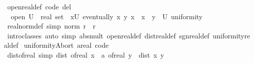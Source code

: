 \begin{isabellebody}
\isanewline
{}\isamarkupfalse%
\ open{\isacharunderscore}{\kern0pt}real{\isacharunderscore}{\kern0pt}def\ {\isacharbrackleft}{\kern0pt}code\ del{\isacharbrackright}{\kern0pt}{\isacharcolon}{\kern0pt}\isanewline
\ \ {\isachardoublequoteopen}open\ {\isacharparenleft}{\kern0pt}U\ {\isacharcolon}{\kern0pt}{\isacharcolon}{\kern0pt}\ real\ set{\isacharparenright}{\kern0pt}\ {\isasymlongleftrightarrow}\ {\isacharparenleft}{\kern0pt}{\isasymforall}x{\isasymin}U{\isachardot}{\kern0pt}\ eventually\ {\isacharparenleft}{\kern0pt}{\isasymlambda}{\isacharparenleft}{\kern0pt}x{\isacharprime}{\kern0pt}{\isacharcomma}{\kern0pt}\ y{\isacharparenright}{\kern0pt}{\isachardot}{\kern0pt}\ x{\isacharprime}{\kern0pt}\ {\isacharequal}{\kern0pt}\ x\ {\isasymlongrightarrow}\ y\ {\isasymin}\ U{\isacharparenright}{\kern0pt}\ uniformity{\isacharparenright}{\kern0pt}{\isachardoublequoteclose}\isanewline
\isanewline
{}\isamarkupfalse%
\ real{\isacharunderscore}{\kern0pt}norm{\isacharunderscore}{\kern0pt}def\ {\isacharbrackleft}{\kern0pt}simp{\isacharbrackright}{\kern0pt}{\isacharcolon}{\kern0pt}\ {\isachardoublequoteopen}norm\ r\ {\isacharequal}{\kern0pt}\ {\isasymbar}r{\isasymbar}{\isachardoublequoteclose}\isanewline
\isanewline
{}\isamarkupfalse%
\isanewline
%
\isadelimproof
\ \ %
\endisadelimproof
%
\isatagproof
{}\isamarkupfalse%
\ intro{\isacharunderscore}{\kern0pt}classes\ {\isacharparenleft}{\kern0pt}auto\ simp{\isacharcolon}{\kern0pt}\ abs{\isacharunderscore}{\kern0pt}mult\ open{\isacharunderscore}{\kern0pt}real{\isacharunderscore}{\kern0pt}def\ dist{\isacharunderscore}{\kern0pt}real{\isacharunderscore}{\kern0pt}def\ sgn{\isacharunderscore}{\kern0pt}real{\isacharunderscore}{\kern0pt}def\ uniformity{\isacharunderscore}{\kern0pt}real{\isacharunderscore}{\kern0pt}def{\isacharparenright}{\kern0pt}%
\endisatagproof
{\isafoldproof}%
%
\isadelimproof
\isanewline
%
\endisadelimproof
\isanewline
{}\isamarkupfalse%
\isanewline
\isanewline
{}\isamarkupfalse%
\ uniformity{\isacharunderscore}{\kern0pt}Abort{\isacharbrackleft}{\kern0pt}\ {\isacharprime}{\kern0pt}a{\isacharequal}{\kern0pt}real{\isacharcomma}{\kern0pt}\ code{\isacharbrackright}{\kern0pt}\isanewline
\isanewline
{}\isamarkupfalse%
\ dist{\isacharunderscore}{\kern0pt}of{\isacharunderscore}{\kern0pt}real\ {\isacharbrackleft}{\kern0pt}simp{\isacharbrackright}{\kern0pt}{\isacharcolon}{\kern0pt}\ {\isachardoublequoteopen}dist\ {\isacharparenleft}{\kern0pt}of{\isacharunderscore}{\kern0pt}real\ x\ {\isacharcolon}{\kern0pt}{\isacharcolon}{\kern0pt}\ {\isacharprime}{\kern0pt}a{\isacharparenright}{\kern0pt}\ {\isacharparenleft}{\kern0pt}of{\isacharunderscore}{\kern0pt}real\ y{\isacharparenright}{\kern0pt}\ {\isacharequal}{\kern0pt}\ dist\ x\ y{\isachardoublequoteclose}\isanewline

\end{isabellebody}
